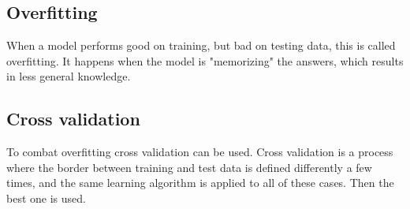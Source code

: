 \subsection{Overfitting}
\label{sec:overfit}
When a model performs good on training, but bad on testing data, this is called overfitting. It happens when the model is "memorizing" the answers, which results in less general knowledge.

\subsection{Cross validation}
To combat overfitting cross validation can be used. Cross validation is a process where the border between training and test data is defined differently a few times, and the same learning algorithm is applied to all of these cases. Then the best one is used.
